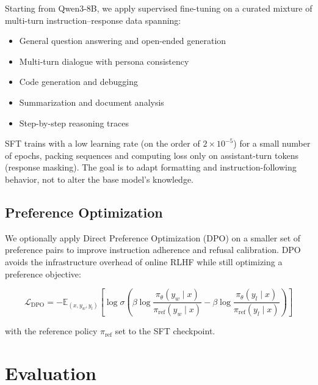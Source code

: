 \documentclass[11pt,a4paper]{article}
\begin{document}
Starting from Qwen3-8B, we apply supervised fine-tuning on a curated mixture of multi-turn
instruction--response data spanning:

\begin{itemize}
  \item General question answering and open-ended generation
  \item Multi-turn dialogue with persona consistency
  \item Code generation and debugging
  \item Summarization and document analysis
  \item Step-by-step reasoning traces
\end{itemize}

SFT trains with a low learning rate (on the order of $2 \times 10^{-5}$) for a small number of
epochs, packing sequences and computing loss only on assistant-turn tokens (response masking). The
goal is to adapt formatting and instruction-following behavior, not to alter the base model's
knowledge.

\subsection{Preference Optimization}

We optionally apply Direct Preference Optimization (DPO) \cite{rafailov2023dpo} on a smaller set of
preference pairs to improve instruction adherence and refusal calibration. DPO avoids the
infrastructure overhead of online RLHF \cite{ouyang2022instructgpt, schulman2017ppo} while still
optimizing a preference objective:

\begin{equation}
  \mathcal{L}_{\text{DPO}} = -\mathbb{E}_{(x, y_w, y_l)}\!\left[\log \sigma\!\left(\beta \log
  \frac{\pi_\theta(y_w \mid x)}{\pi_{\text{ref}}(y_w \mid x)} - \beta \log
  \frac{\pi_\theta(y_l \mid x)}{\pi_{\text{ref}}(y_l \mid x)}\right)\right]
\end{equation}

with the reference policy $\pi_{\text{ref}}$ set to the SFT checkpoint.

\section{Evaluation}
\end{document}
